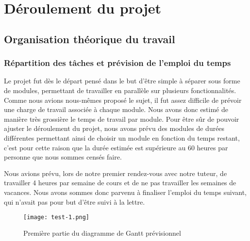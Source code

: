 \graphicspath{{Others/}}
\newpage
\section{Déroulement du projet}
\subsection{Organisation théorique du travail}
\subsubsection{Répartition des tâches et prévision de l'emploi du temps}
Le projet fut dès le départ pensé dans le but d'être simple à séparer sous forme de modules, permettant de travailler en parallèle sur plusieurs fonctionnalités.
Comme nous avions nous-mêmes proposé le sujet, il fut assez difficile de prévoir une charge de travail associée à chaque module. Nous avons donc estimé 
de manière très grossière le temps de travail par module. Pour être sûr de pouvoir ajuster le déroulement du projet, nous avons prévu des modules de durées différentes permettant ainsi
de choisir un module en fonction du temps restant, c'est pour cette raison que la durée estimée est supérieure au 60 heures par personne que nous sommes censés faire.
\par
Nous avions prévu, lors de notre premier rendez-vous avec notre tuteur, de travailler 4 heures par semaine de cours et de ne pas travailler les semaines de vacances.
Nous avons sommes donc parvenu à finaliser l'emploi du temps suivant, qui n'avait pas pour but d'être suivi à la lettre.
\vfill
\begin{figure}[!h]
    \begin{center}
        \texttt{[image: test-1.png]}
        \caption{Première partie du diagramme de Gantt prévisionnel}
    \end{center}
\end{figure}
